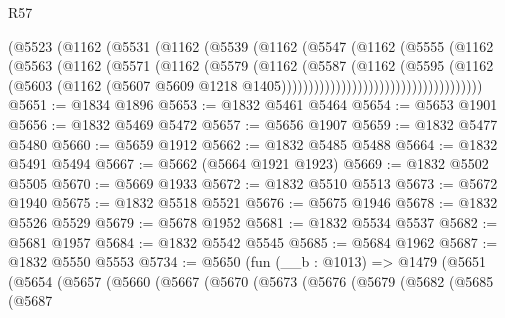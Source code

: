 \begin{lexlean}{R57}
\begin{coremodule}
                                (@5523
                                  (@1162
                                    (@5531
                                      (@1162
                                        (@5539
                                          (@1162
                                            (@5547
                                              (@1162
                                                (@5555
                                                  (@1162
                                                    (@5563
                                                      (@1162
                                                        (@5571
                                                          (@1162
                                                            (@5579
                                                              (@1162
                                                                (@5587
                                                                  (@1162
                                                                    (@5595
                                                                      (@1162
                                                                        (@5603
                                                                          (@1162
                                                                            (@5607
                                                                              @5609
                                                                              @1218
                                                                              @1405)))))))))))))))))))))))))))))))))))))
@5651 := @1834 @1896
@5653 := @1832 @5461 @5464
@5654 := @5653 @1901
@5656 := @1832 @5469 @5472
@5657 := @5656 @1907
@5659 := @1832 @5477 @5480
@5660 := @5659 @1912
@5662 := @1832 @5485 @5488
@5664 := @1832 @5491 @5494
@5667 := @5662 (@5664 @1921 @1923)
@5669 := @1832 @5502 @5505
@5670 := @5669 @1933
@5672 := @1832 @5510 @5513
@5673 := @5672 @1940
@5675 := @1832 @5518 @5521
@5676 := @5675 @1946
@5678 := @1832 @5526 @5529
@5679 := @5678 @1952
@5681 := @1832 @5534 @5537
@5682 := @5681 @1957
@5684 := @1832 @5542 @5545
@5685 := @5684 @1962
@5687 := @1832 @5550 @5553
@5734 := @5650
    (fun (__b : @1013) =>
    @1479
      (@5651
        (@5654
          (@5657
            (@5660
              (@5667
                (@5670
                  (@5673
                    (@5676
                      (@5679
                        (@5682
                          (@5685
                            (@5687

\end{coremodule}
\end{lexlean}
